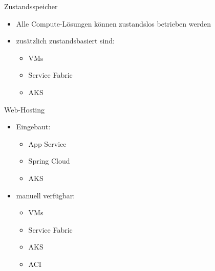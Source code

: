 \begin{flashcard}[]{Zustandsspeicher}
  \begin{itemize}
    \item Alle Compute-Lösungen können zustandslos betrieben werden
    \item zusätzlich zustandsbasiert sind:
      \begin{itemize}
        \item VMs
        \item Service Fabric
        \item AKS
      \end{itemize}
  \end{itemize}
\end{flashcard}

\begin{flashcard}[]{Web-Hosting}
  \begin{itemize}
    \item Eingebaut:
      \begin{itemize}
        \item App Service
        \item Spring Cloud
        \item AKS
      \end{itemize}
    \item manuell verfügbar:
      \begin{itemize}
        \item VMs
        \item Service Fabric
        \item AKS
        \item ACI
      \end{itemize}
  \end{itemize}
\end{flashcard}

